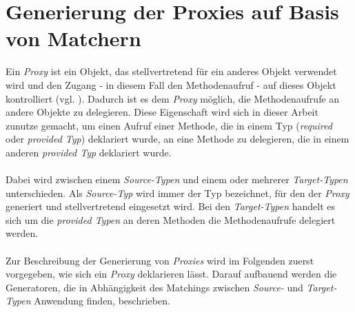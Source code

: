 \section{Generierung der Proxies auf Basis von Matchern}\label{sec_proxygen}
Ein \emph{Proxy} ist ein Objekt, das stellvertretend für ein anderes Objekt verwendet wird und den Zugang - in diesem Fall den Methodenaufruf - auf dieses Objekt kontrolliert (vgl. \cite{patterns}). Dadurch ist es dem \emph{Proxy} möglich, die Methodenaufrufe an andere Objekte zu delegieren. Diese Eigenschaft wird sich in dieser Arbeit zunutze gemacht, um einen Aufruf einer Methode, die in einem Typ (\emph{required} oder \emph{provided Typ}) deklariert wurde, an eine Methode zu delegieren, die in einem anderen \emph{provided Typ} deklariert wurde.
\\\\
Dabei wird zwischen einem \emph{Source-Typen} und einem oder mehrerer \emph{Target-Typen} unterschieden. Als \emph{Source-Typ} wird immer der Typ bezeichnet, für den der \emph{Proxy} generiert und stellvertretend eingesetzt wird. Bei den \emph{Target-Typen} handelt es sich um die \emph{provided Typen} an deren Methoden die Methodenaufrufe delegiert werden.
\\\\
Zur Beschreibung der Generierung von \emph{Proxies} wird im Folgenden zuerst vorgegeben, wie sich ein \emph{Proxy} deklarieren lässt. Darauf aufbauend werden die Generatoren, die in Abhängigkeit des Matchings zwischen \emph{Source-} und \emph{Target-Typen} Anwendung finden, beschrieben.
